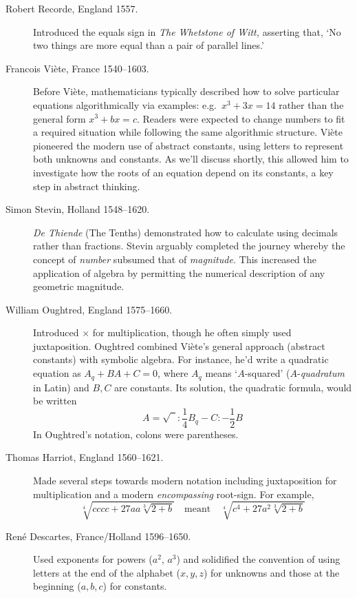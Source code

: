\begin{description}
	\item[Robert Recorde, England 1557.] Introduced the equals sign in \emph{The Whetstone of Witt,}	asserting that, `No two things are more equal than a pair of parallel lines.'
	
	\item[Francois Viète, France 1540--1603.] Before Viète, mathematicians typically described how to solve particular equations algorithmically via examples: e.g.\ $x^3+3x=14$ rather than the general form $x^3+bx=c$. Readers were expected to change numbers to fit a required situation while following the same algorithmic structure. Viète pioneered the modern use of abstract constants, using letters to represent both unknowns and constants. As we'll discuss shortly, this allowed him to investigate how the roots of an equation depend on its constants, a key step in abstract thinking.
	
	\item[Simon Stevin, Holland 1548--1620.] \emph{De Thiende} (The Tenths) demonstrated how to calculate using decimals rather than fractions. Stevin arguably completed the journey whereby the concept of \emph{number} subsumed that of \emph{magnitude.} This increased the application of algebra by permitting the numerical description of any geometric magnitude.
		
	\item[William Oughtred, England 1575--1660.] Introduced $\times$ for multiplication, though he often simply used juxtaposition. Oughtred combined Viète's general approach (abstract constants) with symbolic algebra. For instance, he'd write a quadratic equation as $A_q+BA+C=0$, where $A_q$ means `$A$-squared' ($A$-\emph{quadratum} in Latin) and $B,C$ are constants. Its solution, the quadratic formula, would be written
	\[
		A=\sqrt{\phantom{1}\!\!} :\frac 14B_q-C:-\frac 12B
	\]
	In Oughtred's notation, colons were parentheses.
	
	\item[Thomas Harriot, England 1560--1621.] Made several steps towards modern notation including juxtaposition for multiplication and a modern \emph{encompassing} root-sign. For example, 
	\[
		\sqrt[4]{cccc+27aa\sqrt[3]{2+b}}\quad\text{meant}\quad \sqrt[4]{c^4+27a^2\sqrt[3]{2+b}}
	\]
	
	\item[René Descartes, France/Holland 1596--1650.] Used exponents for powers ($a^2$, $a^3$) and solidified the convention of using letters at the end of the alphabet ($x,y,z$) for unknowns and those at the beginning ($a,b,c$) for constants.
\end{description}


